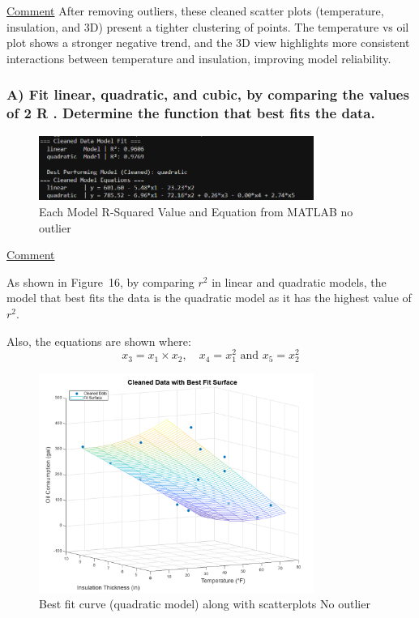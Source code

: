 \documentclass[12pt]{article}
\begin{document}
\uline{Comment}
After removing outliers, these cleaned scatter plots (temperature, insulation, and 3D)
present a tighter clustering of points. The temperature vs oil plot shows a stronger
negative trend, and the 3D view highlights more consistent interactions between
temperature and insulation, improving model reliability.


\subsubsection*{A) Fit linear, quadratic, and cubic, by comparing the values of 2 R . Determine the
function that best fits the data.}

\begin{figure}[H]
    \centering
    \includegraphics[width=0.8\textwidth]{16.png}
    \caption{Each Model R-Squared Value and Equation from MATLAB no outlier}
\end{figure}

\uline{Comment}

As shown in Figure~16, by comparing \( r^2 \) in linear and quadratic models, the model that best fits the data is the quadratic model as it has the highest value of \( r^2 \).

Also, the equations are shown where:
\[
x_3 = x_1 \times x_2, \quad x_4 = x_1^2 \text{ and } x_5 = x_2^2
\]
\begin{figure}[H]
    \centering
    \includegraphics[width=0.8\textwidth]{17.png}
    \caption{Best fit curve (quadratic model) along with scatterplots No outlier}
\end{figure}
\end{document}

